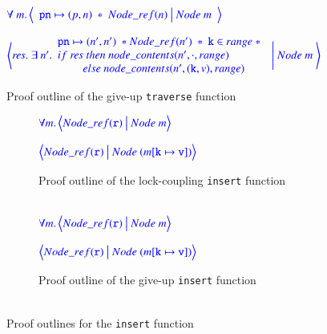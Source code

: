 \documentclass[a4paper,UKenglish,cleveref, autoref, thm-restate]{lipics-v2021}
\newcommand{\treerep}{\ensuremath{\mathsf{Node}}}
\newcommand{\nodeboxrep}{\ensuremath{\mathsf{Node\_ref}}}
\begin{document}
\begin{figure}[!ht]
	$\color{blue}
	\forall \  m. \left\langle
	\begin{array}{c}
		\texttt{pn} \mapsto (p, n) \ \ast \ \nodeboxrep(n) \ \big| \ \treerep\ m
	\end{array}
	\right\rangle$
		
	$\color{blue}
	\left\langle \mathit{res}. \ \exists \  n'.
	\begin{array}{l} \texttt{pn} \mapsto (n', n') \ \ast \nodeboxrep(n') \ \ast \ \texttt{k} \in \mathsf{range}\ \ast \ 
		\\ 
		\mathsf{if} \ \mathit{res} \ \mathsf{then} \ \mathsf{node\_contents}(n', \cdot, \mathsf{range}) \ 
		\\ \ \ \ \ \ \ \ \ \ \mathsf{else} \ \mathsf{node\_contents}(n', (\texttt{k}, \mathsf{v}), \mathsf{range})
	\end{array}
	\ \Bigg| \ \treerep\ m \
	\right\rangle$
	\caption{Proof outline of the give-up \texttt{traverse} function}
	\label{proof_giveup_traverse}
\end{figure}


\begin{figure}[!ht]
	\begin{subfigure}{\textwidth}
		$\color{blue}
		\forall m.\left\langle 
		\nodeboxrep(\texttt{r}) \ \big | \ \treerep\ m
		\right\rangle$
		
		$\color{blue}
		\left\langle 
		\nodeboxrep(\texttt{r}) \ \big | \ \treerep\ (m[\texttt{k} \mapsto \texttt{v}])
		\right\rangle$
		\caption{Proof outline of the lock-coupling \texttt{insert} function \\\\}
		\label{proof_lock_insert}	
	\end{subfigure}\qquad
	\begin{subfigure}{\textwidth}
		$\color{blue}
		\forall m.\left\langle 
		\nodeboxrep(\texttt{r}) \ \big | \ \treerep\ m
		\right\rangle$
		
		$\color{blue}
		\left\langle 
		\nodeboxrep(\texttt{r}) \ \big | \ \treerep\ (m[\texttt{k} \mapsto \texttt{v}])
		\right\rangle$
		\caption{Proof outline of the give-up \texttt{insert} function \\\\}
		\label{proof_giveup_insert}
	\end{subfigure}
	\caption{Proof outlines for the \texttt{insert} function}
	\label{proof_lock_giveup_insert}
\end{figure}
\end{document}
